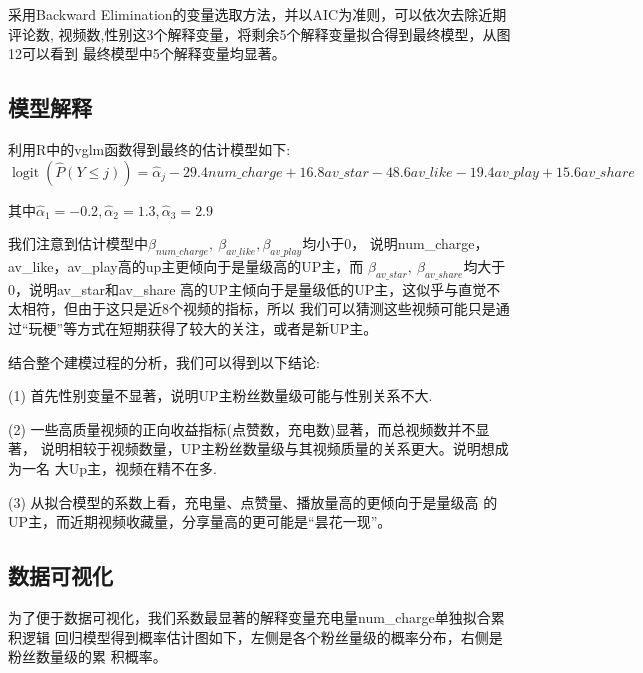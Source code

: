 \documentclass{ctexart}
\begin{document}
采用Backward Elimination的变量选取方法，并以AIC为准则，可以依次去除近期评论数,
视频数,性别这3个解释变量，将剩余5个解释变量拟合得到最终模型，从图12可以看到
最终模型中5个解释变量均显著。

\subsection{模型解释}

利用R中的vglm函数得到最终的估计模型如下:
\begin{equation*}
    \operatorname{logit}(\hat{P}(Y\le j))=\hat\alpha_j-29.4num\_charge+16.8av\_star-48.6av\_like-19.4av\_play+15.6av\_share
\end{equation*}

其中$\hat\alpha_1=-0.2,\hat\alpha_2=1.3,\hat\alpha_3=2.9$

我们注意到估计模型中$\beta_{num\_charge},\ \beta_{av\_like}, \beta_{av\_play}$均小于0，
说明num\_charge，av\_like，av\_play高的up主更倾向于是量级高的UP主，而
$\beta_{av\_star},\ \beta_{av\_share}$均大于0，说明av\_star和av\_share
高的UP主倾向于是量级低的UP主，这似乎与直觉不太相符，但由于这只是近8个视频的指标，所以
我们可以猜测这些视频可能只是通过“玩梗”等方式在短期获得了较大的关注，或者是新UP主。


结合整个建模过程的分析，我们可以得到以下结论:

(1) 首先性别变量不显著，说明UP主粉丝数量级可能与性别关系不大.

(2) 一些高质量视频的正向收益指标(点赞数，充电数)显著，而总视频数并不显著，
说明相较于视频数量，UP主粉丝数量级与其视频质量的关系更大。说明想成为一名
大Up主，视频在精不在多.

(3) 从拟合模型的系数上看，充电量、点赞量、播放量高的更倾向于是量级高
的UP主，而近期视频收藏量，分享量高的更可能是“昙花一现”。

\subsection{数据可视化}

为了便于数据可视化，我们系数最显著的解释变量充电量num\_charge单独拟合累积逻辑
回归模型得到概率估计图如下，左侧是各个粉丝量级的概率分布，右侧是粉丝数量级的累
积概率。
\end{document}
